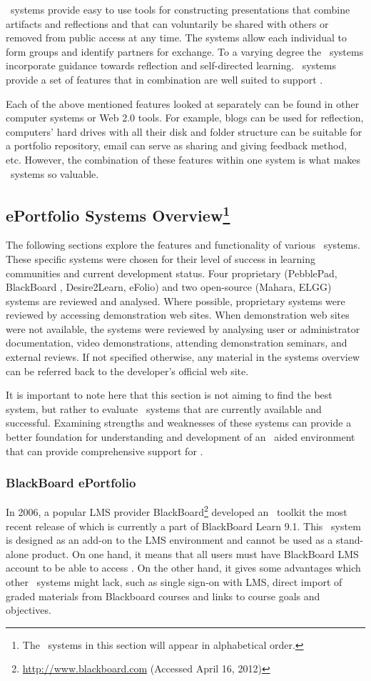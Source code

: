 \ep~systems provide easy to use tools for constructing presentations that
combine artifacts and reflections and that can voluntarily be shared with others
or removed from public access at any time. The systems allow each individual to
form groups and identify partners for exchange. To a varying degree the
\ep~systems incorporate guidance towards reflection and self-directed learning.
\ep~systems provide a set of features that in combination are well suited to
support \LLLsn.

Each of the above mentioned features looked at separately can be found in other
computer systems or Web 2.0 tools. For example, blogs can be used for
reflection, computers' hard drives with all their disk and folder structure can
be suitable for a portfolio repository, email can serve as sharing and giving
feedback method, etc. However, the combination of these features within one
system is what makes \ep~systems so valuable.

\subsection[ePortfolio Systems Overview]{ePortfolio Systems
Overview\footnote{The \ep~systems in this section will appear in alphabetical
order.}} 
The following sections explore the features and functionality of various
\ep~systems. These specific systems were chosen for their level of success in
learning communities and current development status. Four proprietary
(PebblePad, BlackBoard \ep, Desire2Learn, eFolio) and two open-source (Mahara,
ELGG) systems are reviewed and analysed. Where possible, proprietary systems
were reviewed by accessing demonstration web sites. When demonstration web
sites were not available, the systems were reviewed by analysing user or
administrator documentation, video demonstrations, attending demonstration
seminars, and external reviews. If not specified otherwise, any material in
the systems overview can be referred back to the developer's official web site.

It is important to note here that this section is not aiming to find the best
system, but rather to evaluate \ep~systems that are currently available and
successful. Examining strengths and weaknesses of these systems can provide a
better foundation for understanding and development of an \ep~aided environment
that can provide comprehensive support for \LLLsn.

\subsubsection{BlackBoard ePortfolio}
In 2006, a popular LMS provider
BlackBoard\footnote{\url{http://www.blackboard.com} (Accessed April 16, 2012)}
developed an \ep~toolkit the most recent release of which is currently a part of BlackBoard Learn 9.1.
This \ep~system is designed as an add-on to the LMS environment and cannot be
used as a stand-alone product. On one hand, it means that all users must have
BlackBoard LMS account to be able to access \ep. On the other hand, it gives
some advantages which other \ep~systems might lack, such as single sign-on with
LMS, direct import of graded materials from Blackboard courses and links to
course goals and objectives.

